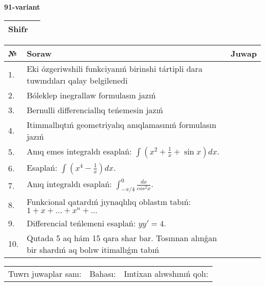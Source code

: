 \documentclass{article}
\begin{document}
  \egroup
  
  \newpage
  
  
  \textbf{91-variant}\\
  
  \bgroup
  \def\arraystretch{1.6} %
  
  \begin{tabular}{|m{5.7cm}|m{9.5cm}|}
  \hline
  Shifr & \\
  \hline
  \end{tabular}
  
  \vspace{1cm}
  
  \begin{tabular}{|m{0.7cm}|m{10cm}|m{4cm}|}
  \hline
  № & Soraw & Juwap \\
  \hline
  1. & Eki ózgeriwshili funkciyanıń birinshi tártipli dara tuwındıları qalay belgilenedi &  \\
  \hline
  2. & Bóleklep inegrallaw formulasın jazıń &  \\
  \hline
  3. & Bernulli differenciallıq teńemesin jazıń &  \\
  \hline
  4. & Itimmallıqtıń geometriyalıq anıqlamasınıń formulasın jazıń &  \\
  \hline
  5. & Anıq emes integraldı esaplań: \(\int{\left( x^2  + \frac{1}{x} + \sin x \right)dx}\). &  \\
  \hline
  6. & Esaplań: \(\int\left( x^{4} - \frac{1}{x} \right)dx\). &  \\
  \hline
  7. & Anıq integraldı esaplań: \(\int_{- \pi/4}^{0}\frac{dx}{cos^2 x}\). &  \\
  \hline
  8. & Funkcional qatardıń jıynaqlılıq oblastın tabıń:\(1 + x + ... + x^{n} + ...\) &  \\
  \hline
  9. & Differencial teńlemeni esaplań: \(yy' = 4\). &  \\
  \hline
  10. & Qutada 5 aq hám 15 qara shar bar. Tosınnan alınǵan bir shardıń aq bolıw itimallıǵın tabıń &  \\
  \hline
  \end{tabular}
  
  \vspace{1cm}
  
  \begin{tabular}{lll}
  Tuwrı juwaplar sanı: \underline{\hspace{1.5cm}} & 
  Bahası: \underline{\hspace{1.5cm}} & 
  Imtixan alıwshınıń qolı: \underline{\hspace{2cm}} \\
  \end{tabular}
  
\end{document}
